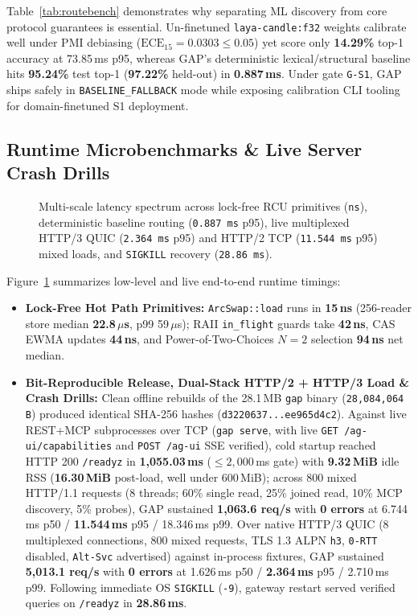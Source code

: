 \documentclass[10pt,twocolumn]{article}
\begin{document}
Table~\ref{tab:routebench} demonstrates why separating ML discovery from core protocol guarantees is essential. Un-finetuned \texttt{laya-candle:f32} weights calibrate well under PMI debiasing ($\text{ECE}_{15}=0.0303 \le 0.05$) yet score only \textbf{14.29\%} top-1 accuracy at 73.85\,ms p95, whereas GAP's deterministic lexical/structural baseline hits \textbf{95.24\%} test top-1 (\textbf{97.22\%} held-out) in \textbf{0.887\,ms}. Under gate \texttt{G-S1}, GAP ships safely in \texttt{BASELINE\_FALLBACK} mode while exposing calibration CLI tooling for domain-finetuned S1 deployment.

\subsection{Runtime Microbenchmarks \& Live Server Crash Drills}

\begin{figure}[t]
  \centering
  
  \caption{Multi-scale latency spectrum across lock-free RCU primitives (\texttt{ns}), deterministic baseline routing (\texttt{0.887\,ms} p95), live multiplexed HTTP/3 QUIC (\texttt{2.364\,ms} p95) and HTTP/2 TCP (\texttt{11.544\,ms} p95) mixed loads, and \texttt{SIGKILL} recovery (\texttt{28.86\,ms}).}
  \label{fig:latency}
\end{figure}

Figure~\ref{fig:latency} summarizes low-level and live end-to-end runtime timings:
\begin{itemize}
  \item \textbf{Lock-Free Hot Path Primitives:} \texttt{ArcSwap::load} runs in \textbf{15\,ns} (256-reader store median \textbf{22.8\,$\mu$s}, p99 59\,$\mu$s); RAII \texttt{in\_flight} guards take \textbf{42\,ns}, CAS EWMA updates \textbf{44\,ns}, and Power-of-Two-Choices $N=2$ selection \textbf{94\,ns} net median.
  \item \textbf{Bit-Reproducible Release, Dual-Stack HTTP/2 + HTTP/3 Load \& Crash Drills:} Clean offline rebuilds of the 28.1\,MB \texttt{gap} binary (\texttt{28,084,064\,B}) produced identical SHA-256 hashes (\texttt{d3220637...ee965d4c2}). Against live REST+MCP subprocesses over TCP (\texttt{gap serve}, with live \texttt{GET /ag-ui/capabilities} and \texttt{POST /ag-ui} SSE verified), cold startup reached HTTP 200 \texttt{/readyz} in \textbf{1,055.03\,ms} ($\le 2,000$\,ms gate) with \textbf{9.32\,MiB} idle RSS (\textbf{16.30\,MiB} post-load, well under 600\,MiB); across 800 mixed HTTP/1.1 requests (8 threads; 60\% single read, 25\% joined read, 10\% MCP discovery, 5\% probes), GAP sustained \textbf{1,063.6 req/s} with \textbf{0 errors} at 6.744\,ms p50 / \textbf{11.544\,ms} p95 / 18.346\,ms p99. Over native HTTP/3 QUIC (8 multiplexed connections, 800 mixed requests, TLS 1.3 ALPN \texttt{h3}, \texttt{0-RTT} disabled, \texttt{Alt-Svc} advertised) against in-process fixtures, GAP sustained \textbf{5,013.1 req/s} with \textbf{0 errors} at 1.626\,ms p50 / \textbf{2.364\,ms} p95 / 2.710\,ms p99. Following immediate OS \texttt{SIGKILL} (\texttt{-9}), gateway restart served verified queries on \texttt{/readyz} in \textbf{28.86\,ms}.
\end{itemize}
\end{document}
